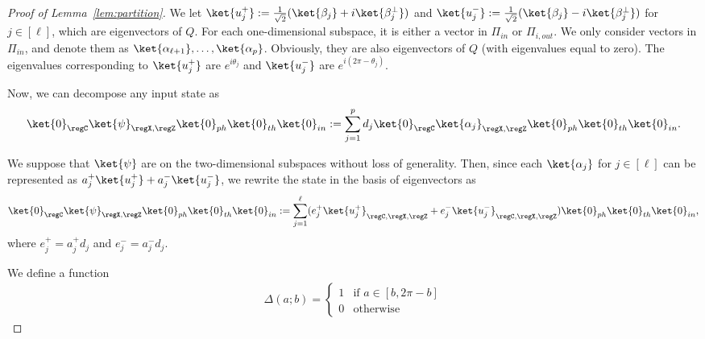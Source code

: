 \begin{proof}[Proof of Lemma~\ref{lem:partition}]
We let $\ket{u^+_{j}} := \frac{1}{\sqrt{2}}(\ket{\beta_j}+ i\ket{\beta^{\bot}_j})$ and $\ket{u^-_{j}} := \frac{1}{\sqrt{2}}(\ket{\beta_j}- i\ket{\beta^{\bot}_j})$ for $j\in [\ell]$, which are eigenvectors of $Q$. For each one-dimensional subspace, it is either a vector in $\Pi_{in}$ or $\Pi_{i,out}$. We only consider vectors in $\Pi_{in}$, and denote them as $\ket{\alpha_{\ell+1}},\dots,\ket{\alpha_{p}}$. Obviously, they are also eigenvectors of $Q$ (with eigenvalues equal to zero). The eigenvalues corresponding to $\ket{u^+_j}$ are $e^{i\theta_j}$ and $\ket{u^-_j}$ are $e^{i(2\pi-\theta_j)}$.  

Now, we can decompose any input state as 
\begin{align*}
    \ket{0}_{\regC}\ket{\psi}_{\regX,\regZ}\ket{0}_{ph}\ket{0}_{th}\ket{0}_{in}:= \sum_{j=1}^p d_j \ket{0}_{\regC}\ket{\alpha_j}_{\regX,\regZ}\ket{0}_{ph}\ket{0}_{th}\ket{0}_{in}. 
\end{align*}

We suppose that $\ket{\psi}$ are on the two-dimensional subspaces without loss of generality. Then, since each $\ket{\alpha_j}$ for $j\in [\ell]$ can be represented as $a^+_j\ket{u^+_j} + a^-_{j}\ket{u^-_{j}}$, we rewrite the state in the basis of eigenvectors as 
\begin{align}
    \ket{0}_{\regC}\ket{\psi}_{\regX,\regZ}\ket{0}_{ph}\ket{0}_{th}\ket{0}_{in}:= \sum_{j=1}^{\ell} (e^+_j \ket{u^+_j}_{\regC,\regX,\regZ} +e^-_j \ket{u^-_j}_{\regC,\regX,\regZ} )\ket{0}_{ph}\ket{0}_{th}\ket{0}_{in},  \label{eq:input_state}
\end{align}
where $e^+_j = a^+_jd_j$ and $e^-_j = a^-_jd_j$. 

We define a function 
\begin{align*}
    \Delta(a;b) = \left\{\begin{matrix} 1 & \mbox{if } a\in [b,2\pi-b]\\
    0 & \mbox{otherwise}\end{matrix}\right.
\end{align*}


\end{proof}
